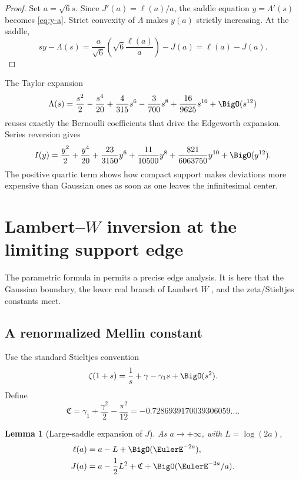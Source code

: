 \documentclass[11pt]{article}
\numberwithin{equation}{section}
\newtheorem{lemma}[theorem]{Lemma}
\theoremstyle{definition}
\begin{document}
\begin{proof}
Set \(a=\sqrt6s\).  Since \(J'(a)=\ell(a)/a\), the saddle equation \(y=\Lambda'(s)\) becomes \eqref{eq:y-a}.  Strict convexity of \(\Lambda\) makes \(y(a)\) strictly increasing.  At the saddle,
\[
 sy-\Lambda(s)
 =\frac{a}{\sqrt6}\left(\sqrt6\frac{\ell(a)}a\right)-J(a)
 =\ell(a)-J(a).
\]
\end{proof}

The Taylor expansion
\begin{equation}\label{eq:Lambda-series}
 \Lambda(s)=\frac{s^2}{2}-\frac{s^4}{20}+\frac4{315}s^6
 -\frac3{700}s^8+\frac{16}{9625}s^{10}+\BigO(s^{12})
\end{equation}
reuses exactly the Bernoulli coefficients that drive the Edgeworth expansion.  Series reversion gives
\begin{equation}\label{eq:I-center-series}
 I(y)=\frac{y^2}{2}+\frac{y^4}{20}+\frac{23}{3150}y^6
 +\frac{11}{10500}y^8+\frac{821}{6063750}y^{10}+\BigO(y^{12}).
\end{equation}
The positive quartic term shows how compact support makes deviations more expensive than Gaussian ones as soon as one leaves the infinitesimal center.

\section{Lambert--\texorpdfstring{$W$}{W} inversion at the limiting support edge}\label{sec:lambert-edge}

The parametric formula in  permits a precise edge analysis.  It is here that the Gaussian boundary, the lower real branch of Lambert \(W\) \cite{CorlessLambertW}, and the zeta/Stieltjes constants meet.

\subsection{A renormalized Mellin constant}
Use the standard Stieltjes convention
\begin{equation}\label{eq:stieltjes-convention}
 \zeta(1+s)=\frac1s+\gamma-\gamma_1s+\BigO(s^2).
\end{equation}
Define
\begin{equation}\label{eq:Cstar}
 \mathfrak C=\gamma_1+\frac{\gamma^2}{2}-\frac{\pi^2}{12}
 =-0.7286939170039306059\ldots.
\end{equation}

\begin{lemma}[Large-saddle expansion of \(J\)]\label{lem:J-asymptotic}
As \(a\to+\infty\), with \(L=\log(2a)\),
\begin{align}
 \ell(a)&=a-L+\BigO(\EulerE^{-2a}),\label{eq:ell-large}\\
 J(a)&=a-\frac12L^2+\mathfrak C+\BigO(\EulerE^{-2a}/a).\label{eq:J-large}
\end{align}
\end{lemma}
\end{document}
